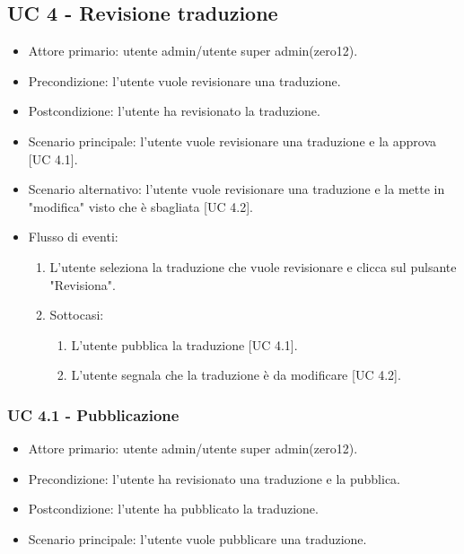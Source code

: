 \subsection{UC 4 - Revisione traduzione}
    \begin{itemize}
        \item Attore primario: utente admin/utente super admin(zero12).
        \item Precondizione: l'utente vuole revisionare una traduzione.
        \item Postcondizione: l'utente ha revisionato la traduzione.
        \item Scenario principale: l'utente vuole revisionare una traduzione e la approva [UC 4.1].
        \item Scenario alternativo: l'utente vuole revisionare una traduzione e la mette in "modifica" visto che è sbagliata [UC 4.2].
        \item Flusso di eventi:
            \begin{enumerate}
                \item L'utente seleziona la traduzione che vuole revisionare e clicca sul pulsante "Revisiona".
                \item Sottocasi:
                    \begin{enumerate}
                        \item L'utente pubblica la traduzione [UC 4.1].
                        \item L'utente segnala che la traduzione è da modificare [UC 4.2].
                    \end{enumerate}
            \end{enumerate}
    \end{itemize}
    \subsubsection{UC 4.1 - Pubblicazione}
        \begin{itemize}
            \item Attore primario: utente admin/utente super admin(zero12).
            \item Precondizione: l'utente ha revisionato una traduzione e la pubblica.
            \item Postcondizione: l'utente ha pubblicato la traduzione.
            \item Scenario principale: l'utente vuole pubblicare una traduzione.
        \end{itemize}
